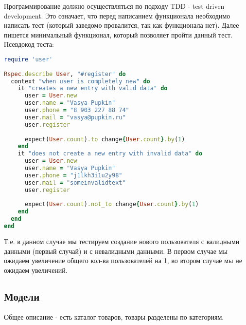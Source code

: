 \documentclass[DIV=calc, paper=a4, fontsize=11pt]{scrartcl} %
\begin{document}
Программирование должно осуществляться по подходу TDD - test driven development. Это означает, что перед написанием функционала необходимо написать тест (который заведомо провалится, так как функционала нет). Далее пишется минимальный функционал, который позволяет пройти данный тест.
\\[0.5cm]
Псевдокод теста:
\begin{lstlisting}[language=Ruby]
require 'user'
	
Rspec.describe User, "#register" do
  context "when user is completely new" do
	it "creates a new entry with valid data" do
	  user = User.new
      user.name = "Vasya Pupkin"
	  user.phone = "8 903 227 88 74"
	  user.mail = "vasya@pupkin.ru"
	  user.register
				
	  expect(User.count).to change{User.count}.by(1)
	end
    it "does not create a new entry with invalid data" do
      user = User.new
	  user.name = "Vasya Pupkin"
	  user.phone = "j1lkh3i1u2y98"
	  user.mail = "someinvalidtext"
	  user.register	
		
      expect(User.count).not_to change{User.count}.by(1)
	end
  end
end
\end{lstlisting}
Т.е. в данном случае мы тестируем создание нового пользователя с валидными данными (первый случай) и с невалидными данными. В первом случае мы ожидаем увеличение общего кол-ва пользователей на 1, во втором случае мы не ожидаем увеличений.

\subsection{Модели}
Общее описание - есть каталог товаров, товары разделены по категориям.
\end{document}
